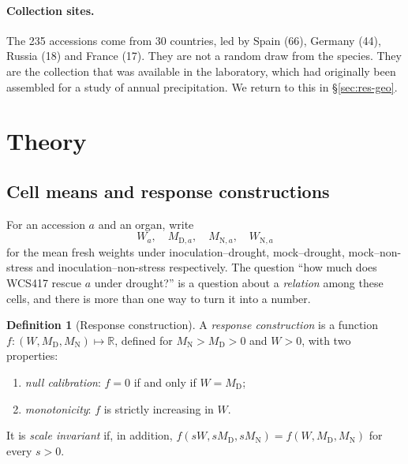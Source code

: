 \documentclass[10pt,twocolumn,a4paper]{article}
\theoremstyle{definition}
\newtheorem{definition}{Definition}[section]
\theoremstyle{remark}
\newcommand{\MD}{{M_{\mathrm D}}}
\newcommand{\MN}{{M_{\mathrm N}}}
\newcommand{\WD}{W}
\newcommand{\Rset}{\mathbb{R}}
\begin{document}
\paragraph{Collection sites.} The 235 accessions come from 30 countries,
led by Spain (66), Germany (44), Russia (18) and France (17). They are
not a random draw from the species. They are the collection that was
available in the laboratory, which had originally been assembled for a
study of annual precipitation. We return to this in
\S\ref{sec:res-geo}.

\section{Theory}
\label{sec:theory}

\subsection{Cell means and response constructions}
\label{sec:constructions}

For an accession $a$ and an organ, write
\[
  \WD_a,\quad M_{\mathrm D,a},\quad M_{\mathrm N,a},\quad W_{\mathrm N,a}
\]
for the mean fresh weights under inoculation--drought, mock--drought,
mock--non-stress and inoculation--non-stress respectively. The question
``how much does WCS417 rescue $a$ under drought?'' is a question about a
\emph{relation} among these cells, and there is more than one way to turn
it into a number.

\begin{definition}[Response construction]
\label{def:construction}
A \emph{response construction} is a function
$f:(\WD,\MD,\MN)\mapsto\Rset$, defined for $\MN>\MD>0$ and $\WD>0$,
with two properties:
\begin{enumerate}[label=(\roman*),leftmargin=1.8em,itemsep=0pt]
  \item \emph{null calibration}: $f=0$ if and only if $\WD=\MD$;
  \item \emph{monotonicity}: $f$ is strictly increasing in $\WD$.
\end{enumerate}
It is \emph{scale invariant} if, in addition,
$f(s\WD,s\MD,s\MN)=f(\WD,\MD,\MN)$ for every $s>0$.
\end{definition}
\end{document}
